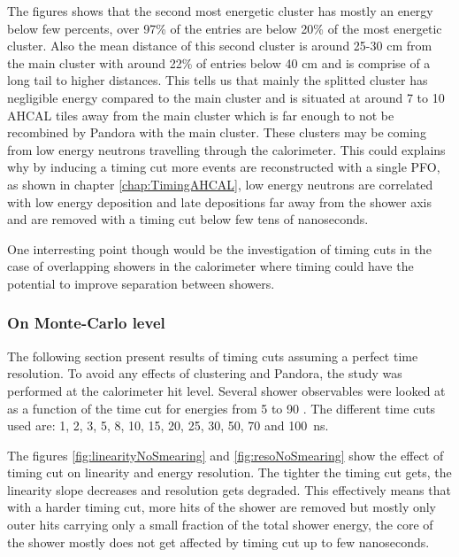 The figures shows that the second most energetic cluster has mostly an energy below few percents, over 97\% of the entries are below 20\% of the most energetic cluster. Also the mean distance of this second cluster is around 25-30 cm from the main cluster with around 22\% of entries below 40 cm and is comprise of a long tail to higher distances. This tells us that mainly the splitted cluster has negligible energy compared to the main cluster and is situated at around 7 to 10 AHCAL tiles away from the main cluster which is far enough to not be recombined by Pandora with the main cluster. These clusters may be coming from low energy neutrons travelling through the calorimeter. This could explains why by inducing a timing cut more events are reconstructed with a single PFO, as shown in chapter \ref{chap:TimingAHCAL}, low energy neutrons are correlated with low energy deposition and late depositions far away from the shower axis and are removed with a timing cut below few tens of nanoseconds.

One interresting point though would be the investigation of timing cuts in the case of overlapping showers in the calorimeter where timing could have the potential to improve separation between showers.

\subsubsection{On Monte-Carlo level}

The following section present results of timing cuts assuming a perfect time resolution. To avoid any effects of clustering and Pandora, the study was performed at the calorimeter hit level. Several shower observables were looked at as a function of the time cut for energies from 5 \GeV to 90 \GeV \kzeroL. The different time cuts used are: 1, 2, 3, 5, 8, 10, 15, 20, 25, 30, 50, 70 and \SI{100}{\nano\second}.

The figures \ref{fig:linearityNoSmearing} and \ref{fig:resoNoSmearing} show the effect of timing cut on linearity and energy resolution. The tighter the timing cut gets, the linearity slope decreases and resolution gets degraded. This effectively means that with a harder timing cut, more hits of the shower are removed but mostly only outer hits carrying only a small fraction of the total shower energy, the core of the shower mostly does not get affected by timing cut up to few nanoseconds.

